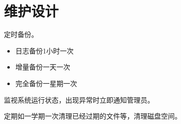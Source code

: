 \chapter{维护设计}

定时备份。
\begin{itemize}
\item 日志备份1小时一次

\item 增量备份一天一次

\item 完全备份一星期一次
\end{itemize}

监视系统运行状态，出现异常时立即通知管理员。

定期如一学期一次清理已经过期的文件等，清理磁盘空间。
